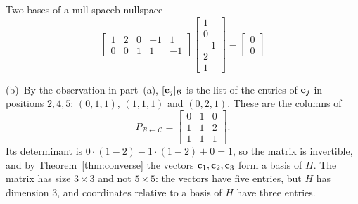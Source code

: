 \documentclass[11pt]{article}
\begin{document}
\begin{exmp}{Two bases of a null space}{b-nullspace}
\[\]
\[
\begin{bmatrix}1&2&0&-1&1\\0&0&1&1&-1\end{bmatrix}\begin{bmatrix}1\\0\\-1\\2\\1\end{bmatrix}=\begin{bmatrix}0\\0\end{bmatrix}
\]

(b)~By the observation in part~(a), $[\mathbf{c}_j]_{\mathcal{B}}$ is the list of the entries of $\mathbf{c}_j$ in positions $2,4,5$: $(0,1,1)$, $(1,1,1)$ and $(0,2,1)$. These are the columns of
\[
P_{\mathcal{B}\leftarrow\mathcal{C}}=\begin{bmatrix}0&1&0\\1&1&2\\1&1&1\end{bmatrix}.
\]
Its determinant is $0\cdot(1-2)-1\cdot(1-2)+0=1$, so the matrix is invertible, and by Theorem~\ref{thm:converse} the vectors $\mathbf{c}_1,\mathbf{c}_2,\mathbf{c}_3$ form a basis of $H$. The matrix has size $3\times3$ and not $5\times5$: the vectors have five entries, but $H$ has dimension $3$, and coordinates relative to a basis of $H$ have three entries.


\end{exmp}
\end{document}
